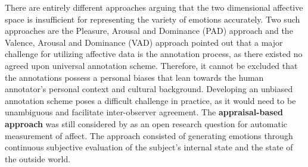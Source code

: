 \newline\newline
There are entirely different approaches arguing that the two dimensional affective space is insufficient for representing the variety of emotions accurately. Two such approaches are the Pleasure, Arousal and Dominance (PAD) approach \citep{Gunes:2011:EmotionRepresentationContinuous} and the Valence, Arousal and Dominance (VAD) approach \citep{Verma:2017:3D-VAD}
\newline\newline
\citet{Gunes:2011:EmotionRepresentationContinuous} pointed out that a major challenge for utilizing affective data is the annotation process, as there existed no agreed upon universal annotation scheme. Therefore, it cannot be excluded that the annotations possess a personal biases that lean towards the human annotator's personal context and cultural background. Developing an unbiased annotation scheme poses a difficult challenge in practice, as it would need to be unambiguous and facilitate inter-observer agreement.
\newline\newline
The \textbf{appraisal-based approach} was still considered by \citet{Gunes:2011:EmotionRepresentationContinuous} as an open research question for automatic measurement of affect. The approach consisted of generating emotions through continuous subjective evaluation of the subject's internal state and the state of the outside world.


